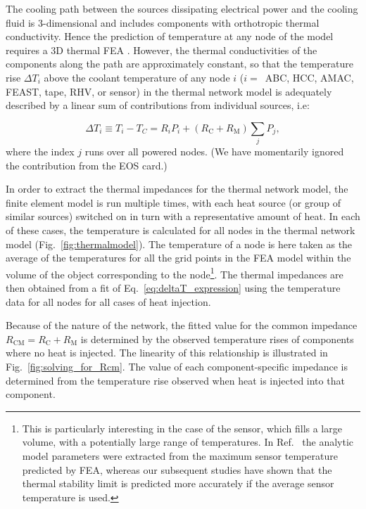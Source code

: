 \label{sec:impedances}

The cooling path between the sources dissipating electrical power and the cooling fluid is 3-dimensional and includes components with orthotropic thermal conductivity. Hence the prediction of temperature at any node of the model requires a 3D thermal FEA \cite{abaqus,ansys}. However, the thermal conductivities of the components along the path are approximately constant, so that the temperature rise $\Delta T_i$ above the coolant temperature of any node $i$ ($i=$~ABC, HCC, AMAC, FEAST, tape, RHV, or sensor) in the thermal network model is adequately described by a linear sum of contributions from individual sources, i.e:

\begin{equation}
\Delta T_i \equiv T_i - T_C = R_i P_i + \left(R_\text{C} + R_\text{M}\right)\sum_j P_j,
\label{eq:deltaT_expression}
\end{equation}
where the index $j$ runs over all powered nodes. (We have momentarily ignored the contribution from the EOS card.)

In order to extract the thermal impedances for the thermal network model, the finite element model is run multiple times, with each heat source (or group of similar sources) switched on in turn with a representative amount of heat. In each of these cases, the temperature is calculated for all nodes in the thermal network model (Fig.~\ref{fig:thermalmodel}). The temperature of a node is here taken as the average of the temperatures for all the grid points in the FEA model within the volume of the object corresponding to the node\footnote{This is particularly interesting in the case of the sensor, which fills a large volume, with a potentially large range of temperatures. In Ref.~\cite{Beck:2010zzd} the analytic model parameters were extracted from the maximum sensor temperature predicted by FEA, whereas our subsequent studies have shown that the thermal stability limit is predicted more accurately if the average sensor temperature is used.}. The thermal impedances are then obtained from a fit of Eq.~\ref{eq:deltaT_expression} using the temperature data for all nodes for all cases of heat injection.

Because of the nature of the network, the fitted value for the common impedance $R_\text{CM}=R_\text{C} + R_\text{M}$ is determined by the observed temperature rises of components where no heat is injected. The linearity of this relationship is illustrated in Fig.~\ref{fig:solving_for_Rcm}. The value of each component-specific impedance is determined from the temperature rise observed when heat is injected into that component.

